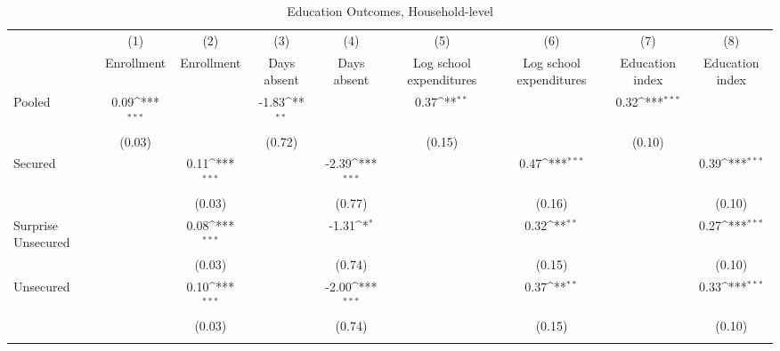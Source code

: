 \begin{table}[htbp]\centering
\def\sym#1{\ifmmode^{#1}\else\(^{#1}\)\fi}
\caption{Education Outcomes, Household-level\label{endline\_educ\_hh}}
\begin{tabular}{l*{8}{c}}
\toprule
                    &\multicolumn{1}{c}{(1)}&\multicolumn{1}{c}{(2)}&\multicolumn{1}{c}{(3)}&\multicolumn{1}{c}{(4)}&\multicolumn{1}{c}{(5)}&\multicolumn{1}{c}{(6)}&\multicolumn{1}{c}{(7)}&\multicolumn{1}{c}{(8)}\\
                    &\multicolumn{1}{c}{Enrollment}&\multicolumn{1}{c}{Enrollment}&\multicolumn{1}{c}{Days absent}&\multicolumn{1}{c}{Days absent}&\multicolumn{1}{c}{Log school expenditures}&\multicolumn{1}{c}{Log school expenditures}&\multicolumn{1}{c}{Education index}&\multicolumn{1}{c}{Education index}\\
\midrule
Pooled              &        0.09\sym{***}&                     &       -1.83\sym{**} &                     &        0.37\sym{**} &                     &        0.32\sym{***}&                     \\
                    &      (0.03)         &                     &      (0.72)         &                     &      (0.15)         &                     &      (0.10)         &                     \\\addlinespace
Secured             &                     &        0.11\sym{***}&                     &       -2.39\sym{***}&                     &        0.47\sym{***}&                     &        0.39\sym{***}\\
                    &                     &      (0.03)         &                     &      (0.77)         &                     &      (0.16)         &                     &      (0.10)         \\\addlinespace
Surprise Unsecured  &                     &        0.08\sym{***}&                     &       -1.31\sym{*}  &                     &        0.32\sym{**} &                     &        0.27\sym{***}\\
                    &                     &      (0.03)         &                     &      (0.74)         &                     &      (0.15)         &                     &      (0.10)         \\\addlinespace
Unsecured           &                     &        0.10\sym{***}&                     &       -2.00\sym{***}&                     &        0.37\sym{**} &                     &        0.33\sym{***}\\
                    &                     &      (0.03)         &                     &      (0.74)         &                     &      (0.15)         &                     &      (0.10)         \\\addlinespace

\end{tabular}
\end{table}
